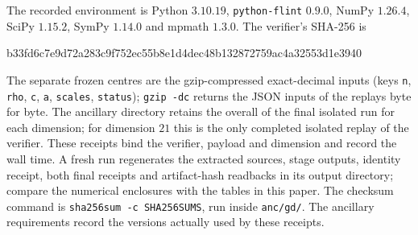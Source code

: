The recorded environment is Python $3.10.19$,
\texttt{python-flint} $0.9.0$, NumPy $1.26.4$, SciPy $1.15.2$,
SymPy $1.14.0$ and mpmath $1.3.0$.
The verifier's SHA-256 is
\begin{center}\ttfamily\footnotesize
b33fd6c7e9d72a283c9f752ec55b8e1d4dec48b132872759ac4a32553d1e3940
\end{center}
The separate frozen centres  are the
gzip-compressed exact-decimal inputs (keys \texttt{n}, \texttt{rho},
\texttt{c}, \texttt{a}, \texttt{scales}, \texttt{status}); \texttt{gzip -dc} returns the JSON inputs
of the replays byte for byte.
The ancillary directory retains the overall
 of the final
isolated run for each dimension; for dimension $21$ this is the only
completed isolated replay of the verifier. These receipts bind the verifier,
payload and dimension and record the wall time. A fresh run regenerates
the extracted sources, stage outputs, identity receipt, both final
receipts and artifact-hash readbacks in its output directory; compare
the numerical enclosures with the tables in this paper.
The checksum command is \texttt{sha256sum -c SHA256SUMS}, run inside
\texttt{anc/gd/}. The ancillary requirements record the versions
actually used by these receipts.

